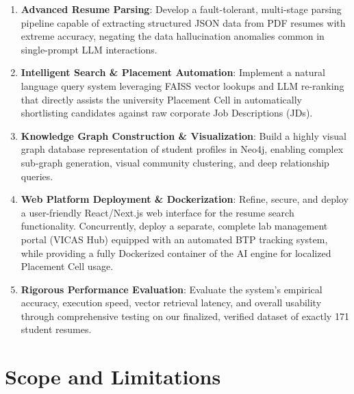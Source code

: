 \documentclass[12pt,a4paper]{report}
\begin{document}
\begin{enumerate}
    \item \textbf{Advanced Resume Parsing}: Develop a fault-tolerant, multi-stage parsing pipeline capable of extracting structured JSON data from PDF resumes with extreme accuracy, negating the data hallucination anomalies common in single-prompt LLM interactions.
    
    \item \textbf{Intelligent Search \& Placement Automation}: Implement a natural language query system leveraging FAISS vector lookups and LLM re-ranking that directly assists the university Placement Cell in automatically shortlisting candidates against raw corporate Job Descriptions (JDs).
    
    \item \textbf{Knowledge Graph Construction \& Visualization}: Build a highly visual graph database representation of student profiles in Neo4j, enabling complex sub-graph generation, visual community clustering, and deep relationship queries.
    
    \item \textbf{Web Platform Deployment \& Dockerization}: Refine, secure, and deploy a user-friendly React/Next.js web interface for the resume search functionality. Concurrently, deploy a separate, complete lab management portal (VICAS Hub) equipped with an automated BTP tracking system, while providing a fully Dockerized container of the AI engine for localized Placement Cell usage.
    
    \item \textbf{Rigorous Performance Evaluation}: Evaluate the system's empirical accuracy, execution speed, vector retrieval latency, and overall usability through comprehensive testing on our finalized, verified dataset of exactly 171 student resumes.
\end{enumerate}

\section{Scope and Limitations}
\end{document}
